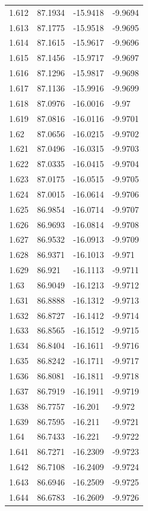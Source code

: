 \begin{tabular}{llll}
1.612 & 87.1934 & -15.9418 & -9.9694 \\
1.613 & 87.1775 & -15.9518 & -9.9695 \\
1.614 & 87.1615 & -15.9617 & -9.9696 \\
1.615 & 87.1456 & -15.9717 & -9.9697 \\
1.616 & 87.1296 & -15.9817 & -9.9698 \\
1.617 & 87.1136 & -15.9916 & -9.9699 \\
1.618 & 87.0976 & -16.0016 & -9.97 \\
1.619 & 87.0816 & -16.0116 & -9.9701 \\
1.62 & 87.0656 & -16.0215 & -9.9702 \\
1.621 & 87.0496 & -16.0315 & -9.9703 \\
1.622 & 87.0335 & -16.0415 & -9.9704 \\
1.623 & 87.0175 & -16.0515 & -9.9705 \\
1.624 & 87.0015 & -16.0614 & -9.9706 \\
1.625 & 86.9854 & -16.0714 & -9.9707 \\
1.626 & 86.9693 & -16.0814 & -9.9708 \\
1.627 & 86.9532 & -16.0913 & -9.9709 \\
1.628 & 86.9371 & -16.1013 & -9.971 \\
1.629 & 86.921 & -16.1113 & -9.9711 \\
1.63 & 86.9049 & -16.1213 & -9.9712 \\
1.631 & 86.8888 & -16.1312 & -9.9713 \\
1.632 & 86.8727 & -16.1412 & -9.9714 \\
1.633 & 86.8565 & -16.1512 & -9.9715 \\
1.634 & 86.8404 & -16.1611 & -9.9716 \\
1.635 & 86.8242 & -16.1711 & -9.9717 \\
1.636 & 86.8081 & -16.1811 & -9.9718 \\
1.637 & 86.7919 & -16.1911 & -9.9719 \\
1.638 & 86.7757 & -16.201 & -9.972 \\
1.639 & 86.7595 & -16.211 & -9.9721 \\
1.64 & 86.7433 & -16.221 & -9.9722 \\
1.641 & 86.7271 & -16.2309 & -9.9723 \\
1.642 & 86.7108 & -16.2409 & -9.9724 \\
1.643 & 86.6946 & -16.2509 & -9.9725 \\
1.644 & 86.6783 & -16.2609 & -9.9726 \\

\end{tabular}
